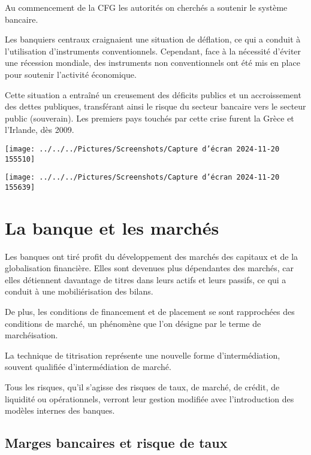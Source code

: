 \documentclass[a4paper, 12pt]{report}
\begin{document}
Au commencement de la CFG les autorités on cherchés a soutenir le système bancaire.

Les banquiers centraux craignaient une situation de déflation, ce qui a conduit à l'utilisation d'instruments conventionnels. Cependant, face à la nécessité d'éviter une récession mondiale, des instruments non conventionnels ont été mis en place pour soutenir l'activité économique.

Cette situation a entraîné un creusement des déficits publics et un accroissement des dettes publiques, transférant ainsi le risque du secteur bancaire vers le secteur public (souverain). Les premiers pays touchés par cette crise furent la Grèce et l'Irlande, dès 2009.

\begin{center}
	\texttt{[image: ../../../Pictures/Screenshots/Capture d'écran 2024-11-20 155510]}
\end{center}
\begin{center}
	\texttt{[image: ../../../Pictures/Screenshots/Capture d'écran 2024-11-20 155639]}
\end{center}

\chapter{La banque et les marchés}

Les banques ont tiré profit du développement des marchés des capitaux et de la globalisation financière. Elles sont devenues plus dépendantes des marchés, car elles détiennent davantage de titres dans leurs actifs et leurs passifs, ce qui a conduit à une mobiliérisation des bilans.

De plus, les conditions de financement et de placement se sont rapprochées des conditions de marché, un phénomène que l'on désigne par le terme de marchéisation.

La technique de titrisation représente une nouvelle forme d'intermédiation, souvent qualifiée d'intermédiation de marché. 

Tous les risques, qu'il s'agisse des risques de taux, de marché, de crédit, de liquidité ou opérationnels, verront leur gestion modifiée avec l'introduction des modèles internes des banques.

\section{Marges bancaires et risque de taux}
\end{document}
